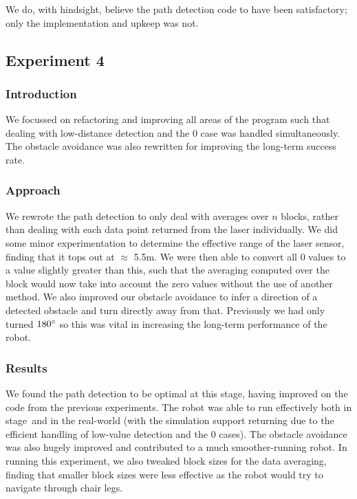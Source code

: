 \documentclass[twocolumn,11pt]{article}
\newcommand{\stage}{\textsf{stage}}
\begin{document}
We do, with hindsight, believe the path detection code to have been satisfactory; only the implementation and upkeep was not.

\subsection{Experiment 4}

\subsubsection{Introduction}

We focussed on refactoring and improving all areas of the program such that dealing with low-distance detection and the $0$ case was handled simultaneously. The obstacle avoidance was also rewritten for improving the long-term success rate.

\subsubsection{Approach}

We rewrote the path detection to only deal with averages over $n$ blocks, rather than dealing with each data point returned from the laser individually. We did some minor experimentation to determine the effective range of the laser sensor, finding that it tops out at $\approx$ 5.5m. We were then able to convert all $0$ values to a value slightly greater than this, such that the averaging computed over the block would now take into account the zero values without the use of another method. We also improved our obstacle avoidance to infer a direction of a detected obstacle and turn directly away from that. Previously we had only turned $180\degree$ so this was vital in increasing the long-term performance of the robot.

\subsubsection{Results}

We found the path detection to be optimal at this stage, having improved on the code from the previous experiments. The robot was able to run effectively both in \stage\ and in the real-world (with the simulation support returning due to the efficient handling of low-value detection and the $0$ cases). The obstacle avoidance was also hugely improved and contributed to a much smoother-running robot. In running this experiment, we also tweaked block sizes for the data averaging, finding that smaller block sizes were less effective as the robot would try to navigate through chair legs.
\end{document}
